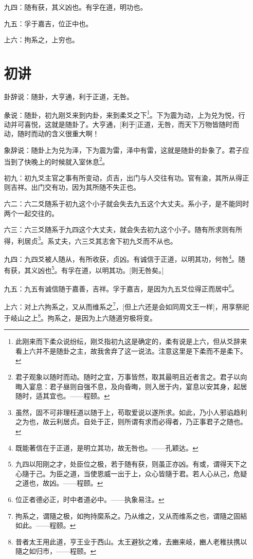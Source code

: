 \documentclass[12pt,oneside]{book}
\begin{document}
九四：随有获，其义凶也。有孚在道，明功也。

九五：孚于嘉吉，位正中也。

上六：拘系之，上穷也。


\section{初讲}
卦辞说：随卦，大亨通，利于正道，无咎。

彖说：随卦，初九刚爻来到内卦，来到柔爻之下\footnote{此刚来而下柔众说纷纭，刚爻指初九这是确定的，柔有说是上六，但从爻辞来看上六并不是随卦之主，故我舍弃了这一说法。注意这里是下柔而不是柔下。}。下为震为动，上为兑为悦，行动并可喜悦，这就是随卦了。大亨通，[利于]正道，无咎，而天下万物皆随时而动，随时而动的含义很重大啊！

象辞说：随卦上为兑为泽，下为震为雷，泽中有雷，这就是随卦的卦象了。君子应当到了快晚上的时候就入室休息\footnote{君子观象以随时而动。随时之宜，万事皆然，取其最明且近者言之。君子以向晦入宴息：君子昼则自强不息，及向昏晦，则入居于内，宴息以安其身，起居随时，适其宜也。——程颐。}。

初九：初九爻主官之事有所变动，贞吉，出门与人交往有功。官有渝，其所从得正则吉祥。出门交有功，因为其所随不失正也。

六二：六二爻随系于初九这个小子就会失去九五这个大丈夫。系小子，是不能同时两个一起交往的。

六三：六三爻随系于九四这个大丈夫，就会失去初九这个小子。随有所求则有所得，利居贞\footnote{虽然，固不可非理枉道以随于上，苟取爱说以遂所求。如此，乃小人邪谄趋利之为也，故云利居贞。自处于正，则所谓有求而必得者，乃正事君子之随也。}。系丈夫，六三爻其志舍下初九爻而不从也。

九四：九四爻被人随从，有所收获，贞凶。有诚信于正道，以明其功，何咎\footnote{既能著信在于正道，是明立其功，故无咎也。——孔颖达。}。随有获，其义凶也\footnote{九四以阳刚之才，处臣位之极，若于随有获，则虽正亦凶。有或，谓得天下之心隨于己。为臣之道，当使恩威一出于上，众心皆隨于君。若人心从己，危疑之道也，故凶。——程颐。}。有孚在道，以明其功。[则无咎矣。]

九五：九五有诚信随于嘉善，吉祥。孚于嘉吉，是因为九五爻位得正而居中\footnote{位正者德必正，时中者道必中。——执象易注。}。

上六：对上六拘系之，又从而维系之\footnote{拘系之，谓隨之极，如拘持縻系之。乃从维之，又从而维系之也，谓隨之固結如此。——程颐。}，[但上六还是会如同周文王一样]，用享祭祀于岐山之上\footnote{昔者太王用此道，亨王业于西山。太王避狄之难，去豳来岐，豳人老稚扶携以隨之如归市，——程颐。}。拘系之，是因为上六随道穷极将变。
\end{document}
